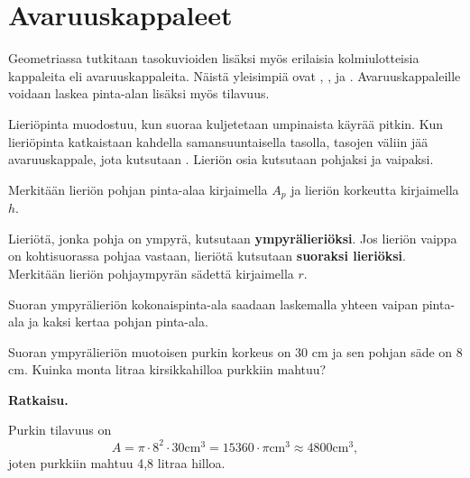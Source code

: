 \section*{Avaruuskappaleet}
Geometriassa tutkitaan tasokuvioiden lisäksi myös erilaisia kolmiulotteisia kappaleita eli avaruuskappaleita. Näistä yleisimpiä ovat , ,  ja . Avaruuskappaleille voidaan laskea pinta-alan lisäksi myös tilavuus.


Lieriöpinta muodostuu, kun suoraa kuljetetaan umpinaista käyrää pitkin. Kun lieriöpinta katkaistaan kahdella samansuuntaisella tasolla, tasojen väliin jää avaruuskappale, jota kutsutaan . Lieriön osia kutsutaan pohjaksi ja vaipaksi.

Merkitään lieriön pohjan pinta-alaa kirjaimella $A_p$ ja lieriön korkeutta kirjaimella $h$.


Lieriötä, jonka pohja on ympyrä, kutsutaan \textbf{ympyrälieriöksi}. Jos lieriön vaippa on kohtisuorassa pohjaa vastaan, lieriötä kutsutaan \textbf{suoraksi lieriöksi}. Merkitään lieriön pohjaympyrän sädettä kirjaimella $r$.


Suoran ympyrälieriön kokonaispinta-ala saadaan laskemalla yhteen vaipan pinta-ala ja kaksi kertaa pohjan pinta-ala.


\begin{esimerkki}
Suoran ympyrälieriön muotoisen purkin korkeus on 30 cm ja sen pohjan säde on 8 cm. Kuinka monta litraa kirsikkahilloa purkkiin mahtuu?

\textbf{Ratkaisu.}

Purkin tilavuus on
$$A=\pi\cdot 8^2 \cdot 30 \text{cm}^3 = 15360 \cdot \pi \text{cm}^3 \approx 4800 \text{cm}^3,$$
joten purkkiin mahtuu 4,8 litraa hilloa.
\end{esimerkki}

